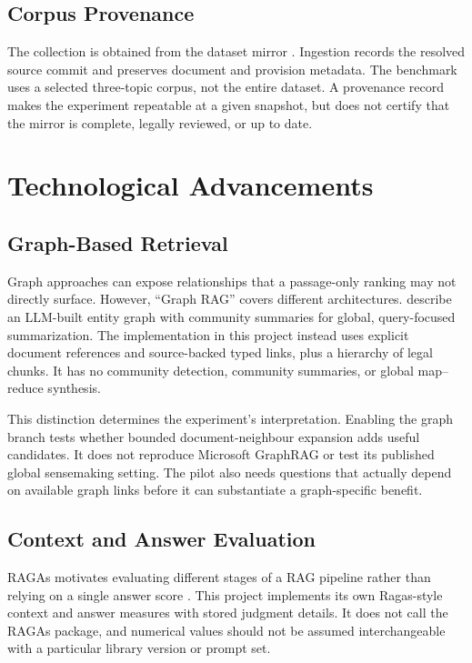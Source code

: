 \documentclass[11pt,a4paper,oneside]{report}
\newcommand{\code}[1]{\texttt{\detokenize{#1}}}
\begin{document}
\subsection{Corpus Provenance}
The collection is obtained from the \code{tmquan/phapdien-moj-gov-vn} dataset mirror \citep{phapdien}. Ingestion records the resolved source commit and preserves document and provision metadata. The benchmark uses a selected three-topic corpus, not the entire dataset. A provenance record makes the experiment repeatable at a given snapshot, but does not certify that the mirror is complete, legally reviewed, or up to date.

\section{Technological Advancements}
\subsection{Graph-Based Retrieval}
Graph approaches can expose relationships that a passage-only ranking may not directly surface. However, ``Graph RAG'' covers different architectures. \citet{edge2024graph} describe an LLM-built entity graph with community summaries for global, query-focused summarization. The implementation in this project instead uses explicit document references and source-backed typed links, plus a hierarchy of legal chunks. It has no community detection, community summaries, or global map--reduce synthesis.

This distinction determines the experiment's interpretation. Enabling the graph branch tests whether bounded document-neighbour expansion adds useful candidates. It does not reproduce Microsoft GraphRAG or test its published global sensemaking setting. The pilot also needs questions that actually depend on available graph links before it can substantiate a graph-specific benefit.

\subsection{Context and Answer Evaluation}
RAGAs motivates evaluating different stages of a RAG pipeline rather than relying on a single answer score \citep{es2024ragas}. This project implements its own Ragas-style context and answer measures with stored judgment details. It does not call the RAGAs package, and numerical values should not be assumed interchangeable with a particular library version or prompt set.
\end{document}
